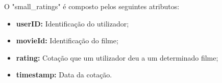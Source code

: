 O "small\_ratings"  é composto pelos seguintes atributos:

\begin{itemize}
    \item \textbf{userID:} Identificação do utilizador;
    \item \textbf{movieId:} Identificação do filme;
    \item \textbf{rating:} Cotação que um utilizador deu a um determinado filme;
    \item \textbf{timestamp:} Data da cotação.
\end{itemize}


\newpage
